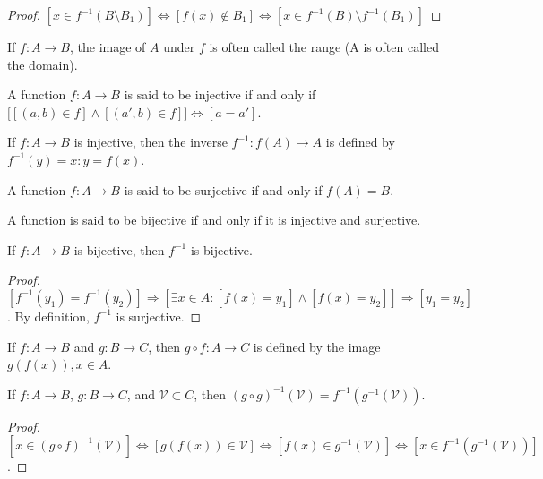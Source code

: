 \documentclass[crop=false,class=article,oneside]{standalone}
\begin{document}
        \begin{proof}
        $[x\in f^{-1}(B\setminus B_1)]\Leftrightarrow [f(x)\notin B_1]\Leftrightarrow [x\in f^{-1}(B)\setminus f^{-1}(B_1)]$
        \end{proof}
        \begin{remark}
        If $f:A\rightarrow B$, the image of $A$ under $f$ is often called the range (A is often called the domain).
        \end{remark}
        \begin{definition}
        A function $f:A\rightarrow B$ is said to be injective if and only if $\big[[(a,b)\in f]\land[(a',b)\in f]\big]\Leftrightarrow [a=a']$.
        \end{definition}
        \begin{definition}
        If $f:A\rightarrow B$ is injective, then the inverse $f^{-1}:f(A)\rightarrow A$ is defined by $f^{-1}(y)=x:y=f(x)$.
        \end{definition}
        \begin{definition}
        A function $f:A\rightarrow B$ is said to be surjective if and only if $f(A) = B$.
        \end{definition}
        \begin{definition}
        A function is said to be bijective if and only if it is injective and surjective.
        \end{definition}
        \begin{theorem}
        If $f:A\rightarrow B$ is bijective, then $f^{-1}$ is bijective.
        \end{theorem}
        \begin{proof}
        $[f^{-1}(y_1) = f^{-1}(y_2)]\Rightarrow [\exists x\in A:[f(x) = y_1]\land [f(x)=y_2]]\Rightarrow [y_1=y_2]$. By definition, $f^{-1}$ is surjective.
        \end{proof}
        \begin{definition}
        If $f:A\rightarrow B$ and $g:B\rightarrow C$, then $g\circ f:A\rightarrow C$ is defined by the image $g(f(x)), x\in A$. 
        \end{definition}
        \begin{theorem}
        If $f:A\rightarrow B$, $g:B\rightarrow C$, and $\mathcal{V}\subset C$, then $(g\circ g)^{-1}(\mathcal{V}) = f^{-1}(g^{-1}(\mathcal{V}))$.
        \end{theorem}
        \begin{proof}
        $[x\in (g\circ f)^{-1}(\mathcal{V})]\Leftrightarrow [g(f(x))\in \mathcal{V}] \Leftrightarrow [f(x)\in g^{-1}(\mathcal{V})]\Leftrightarrow [x\in f^{-1}(g^{-1}(\mathcal{V}))]$.
        \end{proof}
\end{document}
